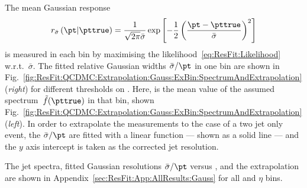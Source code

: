 The mean Gaussian response
\begin{equation*}
  r_{\bar{\sigma}}\left(\pt|\pttrue\right) = 
  \frac{1}{\sqrt{2\pi}\bar{\sigma}}\exp\left[-\frac{1}{2}\left(\frac{\pt - \pttrue}{\bar{\sigma}}\right)^{2}\right]
\end{equation*}
is measured in each bin by maximising the likelihood~\eqref{eq:ResFit:Likelihood} w.r.t.~$\bar{\sigma}$.
The fitted relative Gaussian widths $\bar{\sigma}/\pt$ in one \pt bin are shown in Fig.~\ref{fig:ResFit:QCDMC:Extrapolation:Gauss:ExBin:SpectrumAndExtrapolation} (\textit{right}) for different thresholds on \ptrel.
Here, \pt is the mean value of the assumed spectrum~$\tilde{f}(\pttrue)$ in that bin, shown Fig.~\ref{fig:ResFit:QCDMC:Extrapolation:Gauss:ExBin:SpectrumAndExtrapolation} (\textit{left}).
In order to extrapolate the measurements to the case of a two jet only event, the $\bar{\sigma}/\pt$ are fitted with a linear function --- shown as a solid line --- and the $y$ axis intercept is taken as the corrected jet \pt resolution.

The jet \pt spectra, fitted Gaussian resolutions $\bar{\sigma}/\pt$ versus \ptrel, and the extrapolation are shown in Appendix~\ref{sec:ResFit:App:AllResults:Gauss} for all \pt and $\eta$ bins.

